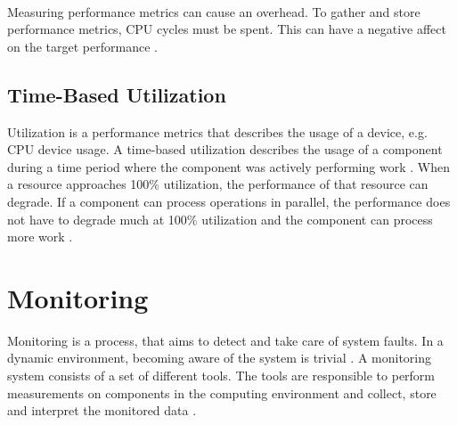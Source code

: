 \paragraph{}Measuring performance metrics can cause an overhead. To gather and store performance metrics, CPU cycles must be spent. This can have a negative affect on the target performance \cite{Greg2020SysPerf}.


\subsection{Time-Based Utilization}
Utilization is a performance metrics that describes the usage of a device, e.g. CPU device usage.
A time-based utilization describes the usage of a component during a time period where the component was actively performing work \cite{Greg2020SysPerf}.
When a resource approaches 100\% utilization, the performance of that resource can degrade. If a component can process operations in parallel, the performance does not have to degrade much at 100\% utilization and the component can process more work \cite{Greg2020SysPerf}.


\section{Monitoring}
\label{sec:02_monitoring}
Monitoring is a process, that aims to detect and take care of system faults. In a dynamic environment, becoming aware of the system is trivial \cite{Ligus2012EffMonitoring}.
A monitoring system consists of a set of different tools. The tools are responsible to perform measurements on components in the computing environment and collect, store and interpret the monitored data \cite{Ligus2012EffMonitoring}. 


